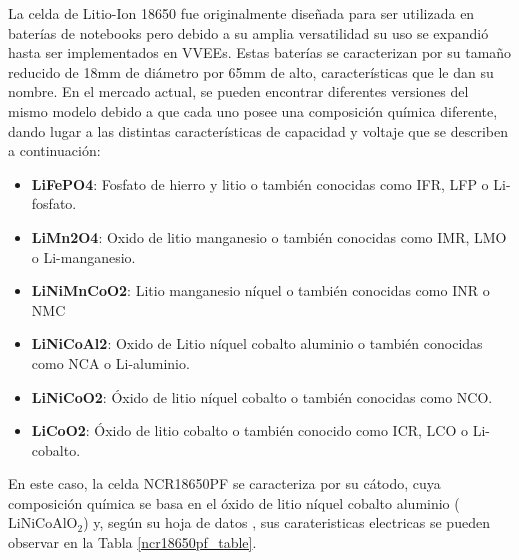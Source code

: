 \documentclass[10pt, a4paper]{report}
\begin{document}
La celda de Litio-Ion 18650 fue originalmente diseñada para ser utilizada en
bater\'ias de notebooks pero debido a su amplia versatilidad su uso se
expandi\'o hasta ser implementados en \acrshort{VVEE}s. Estas bater\'ias se
caracterizan por su tamaño reducido de 18mm de di\'ametro por 65mm de alto,
características que le dan su nombre. En el mercado actual, se pueden encontrar
diferentes versiones del mismo modelo debido a que cada uno posee una
composici\'on qu\'imica diferente, dando lugar a las distintas caracter\'isticas
de capacidad y voltaje que se describen a continuaci\'on:

\begin{itemize}
    \item \textbf{LiFePO4}: Fosfato de hierro y litio o tambi\'en conocidas como
        IFR, LFP o Li-fosfato.
    \item \textbf{LiMn2O4}: Oxido de litio manganesio o tambi\'en conocidas como
        IMR, LMO o Li-manganesio.
    \item \textbf{LiNiMnCoO2}: Litio manganesio n\'iquel o tambi\'en conocidas como
        INR o NMC
    \item \textbf{LiNiCoAl2}: Oxido de Litio n\'iquel cobalto aluminio o
        tambi\'en conocidas como NCA o Li-aluminio.
    \item \textbf{LiNiCoO2}: \'Oxido de litio n\'iquel cobalto o tambi\'en
        conocidas como NCO.
    \item \textbf{LiCoO2}: \'Oxido de litio cobalto o tambi\'en conocido como
        ICR, LCO o Li-cobalto.
\end{itemize}

En este caso, la celda NCR18650PF se caracteriza por su cátodo, cuya composición 
química se basa en el óxido de litio níquel cobalto aluminio 
($\mathrm{LiNiCoAlO_2}$) y, según su hoja de datos \cite{18650pf}, sus 
carateristicas electricas se pueden observar en la Tabla \ref{ncr18650pf_table}.
\end{document}

